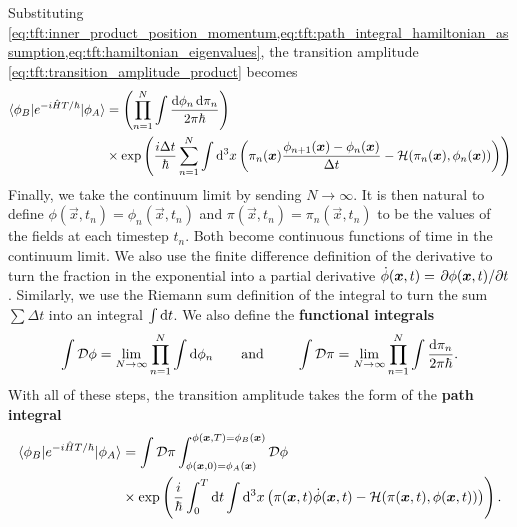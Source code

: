 Substituting \cref{eq:tft:inner_product_position_momentum,eq:tft:path_integral_hamiltonian_assumption,eq:tft:hamiltonian_eigenvalues}, the transition amplitude \eqref{eq:tft:transition_amplitude_product} becomes
\begin{equation}
\begin{split}
	\braket{\phi_B | e^{- i \hat{H} T / \hbar} | \phi_A} &=      \left( \prod_{n=1}^N \int \frac{\mathop{}\!\mathrm{d} \phi_n \mathop{}\!\mathrm{d} \pi_n}{2 \pi \hbar} \right) \\
	           &\times \exp \left( \frac{i \Delta t}{\hbar} \sum_{n=1}^N \int \mathop{}\!\mathrm{d}^3 x \left( \pi_n({\bm{x}}) \frac{\phi_{n+1}({\bm{x}}) - \phi_n({\bm{x}})}{\Delta t} - \mathcal{H}(\pi_n({\bm{x}}), \phi_n({\bm{x}})) \right)
	\right)
\end{split}
\end{equation}
Finally, we take the continuum limit by sending $N \rightarrow \infty$.
It is then natural to define
$\phi(\vec{x}, t_n) = \phi_n(\vec{x}, t_n)$
and
$\pi(\vec{x}, t_n) = \pi_n(\vec{x}, t_n)$
to be the values of the fields at each timestep $t_n$.
Both become continuous functions of time in the continuum limit.
We also use the finite difference definition of the derivative to turn the fraction in the exponential into a partial derivative $\dot{\phi}({\bm{x}},t) = \pdv{\phi({\bm{x}},t)}/{t}$.
Similarly, we use the Riemann sum definition of the integral to turn the sum $\sum \Delta t$ into an integral $\int \mathop{}\!\mathrm{d} t$.
We also define the \textbf{functional integrals}
\begin{equation}
	\int \pathintdif \phi = \lim_{N \rightarrow \infty} \prod_{n=1}^{N} \int \dif \phi_n
	\qquad \text{and} \qquad
	\int \pathintdif \pi = \lim_{N \rightarrow \infty} \prod_{n=1}^{N} \int \frac{\dif \pi_n}{2 \pi \hbar} .
\label{eq:tft:functional_integral}
\end{equation}
With all of these steps, the transition amplitude takes the form of the \textbf{path integral}
\begin{equation}
\begin{split}
	\braket{\phi_B | e^{- i \hat{H} T / \hbar} | \phi_A} &=      \int \mathcal{D} \pi \int_{\phi({\bm{x}}, 0)=\phi_A({\bm{x}})}^{\phi({\bm{x}},T)=\phi_B({\bm{x}})} \mathcal{D} \phi \\
	           &\times \exp \left( \frac{i}{\hbar} \int_0^T \mathop{}\!\mathrm{d} t \int \mathop{}\!\mathrm{d}^3 x \left( \pi({\bm{x}}, t) \dot{\phi}({\bm{x}}, t) - \mathcal{H}(\pi({\bm{x}}, t), \phi({\bm{x}}, t)) \right) \right) .
\end{split}
\label{eq:tft:path_integral_hamiltonian}
\end{equation}

